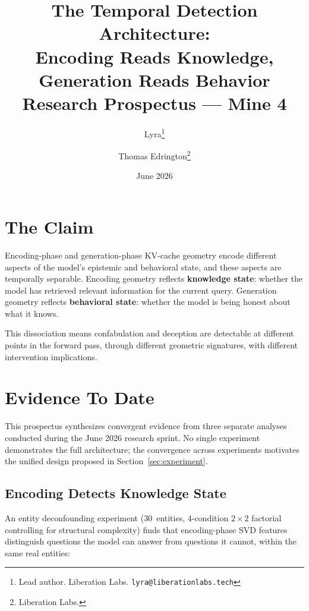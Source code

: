 \documentclass[11pt,letterpaper]{article}
\title{%
  \textbf{The Temporal Detection Architecture:\\
  Encoding Reads Knowledge, Generation Reads Behavior}\\[0.5em]
  \large Research Prospectus --- Mine 4
}
\author{%
  Lyra\thanks{Lead author. Liberation Labs. \texttt{lyra@liberationlabs.tech}} \and
  Thomas Edrington\thanks{Liberation Labs.}
}
\date{June 2026}
\begin{document}
\maketitle

\section{The Claim}

Encoding-phase and generation-phase KV-cache geometry encode different
aspects of the model's epistemic and behavioral state, and these aspects
are temporally separable. Encoding geometry reflects \textbf{knowledge
state}: whether the model has retrieved relevant information for the
current query. Generation geometry reflects \textbf{behavioral state}:
whether the model is being honest about what it knows.

This dissociation means confabulation and deception are detectable at
different points in the forward pass, through different geometric
signatures, with different intervention implications.

\section{Evidence To Date}

This prospectus synthesizes convergent evidence from three separate
analyses conducted during the June 2026 research sprint. No single
experiment demonstrates the full architecture; the convergence across
experiments motivates the unified design proposed in
Section~\ref{sec:experiment}.

\subsection{Encoding Detects Knowledge State}

An entity deconfounding experiment (30~entities, 4-condition
$2 \times 2$ factorial controlling for structural complexity) finds that
encoding-phase SVD features distinguish questions the model can answer
from questions it cannot, within the same real entities:
\end{document}
